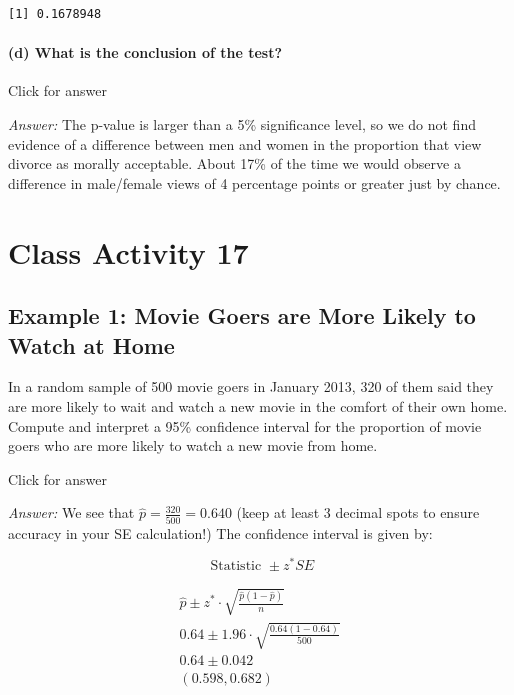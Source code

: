 \documentclass[
]{book}
\begin{document}
\begin{verbatim}
[1] 0.1678948
\end{verbatim}

\hypertarget{d-what-is-the-conclusion-of-the-test-1}{%
\subsubsection{(d) What is the conclusion of the test?}\label{d-what-is-the-conclusion-of-the-test-1}}

Click for answer

\emph{Answer:} The p-value is larger than a 5\% significance level, so we do not find evidence of a difference between men and women in the proportion that view divorce as morally acceptable. About 17\% of the time we would observe a difference in male/female views of 4 percentage points or greater just by chance.

\hypertarget{class-activity-17}{%
\chapter{Class Activity 17}\label{class-activity-17}}

\hypertarget{example-1-movie-goers-are-more-likely-to-watch-at-home}{%
\section{Example 1: Movie Goers are More Likely to Watch at Home}\label{example-1-movie-goers-are-more-likely-to-watch-at-home}}

In a random sample of 500 movie goers in January 2013, 320 of them said they are more likely to wait and watch a new movie in the comfort of their own home. Compute and interpret a 95\% confidence interval for the proportion of movie goers who are more likely to watch a new movie from home.

Click for answer

\emph{Answer:} We see that \(\hat{p}=\frac{320}{500}=0.640\) (keep at least 3 decimal spots to ensure accuracy in your SE calculation!) The confidence interval is given by:

\[\text { Statistic }\pm z^{*} S E\]

\[\begin{array}{l}
\hat{p} \pm z^{*} \cdot \sqrt{\frac{\hat{p}(1-\hat{p})}{n}} \\
0.64 \pm 1.96 \cdot \sqrt{\frac{0.64(1-0.64)}{500}} \\
0.64 \pm 0.042\\
(0.598, 0.682)
\end{array}\]
\end{document}
